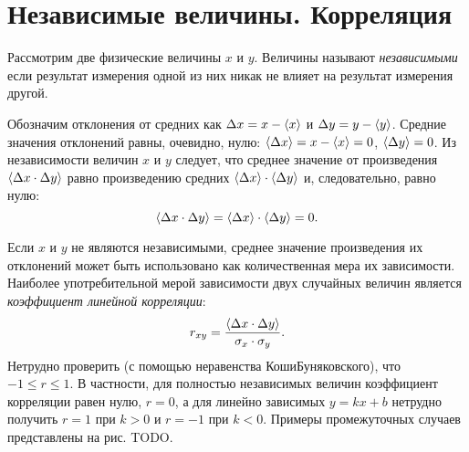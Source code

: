 %

\section{Независимые величины. Корреляция}

Рассмотрим две физические величины $x$ и $y$. Величины называют
\emph{независимыми} если результат измерения одной из них никак не
влияет на результат измерения другой.

Обозначим отклонения от средних как $\Delta x=x-\left<x\right>$ и $\Delta
y=y-\left<y\right>$.
Средние значения отклонений равны, очевидно, нулю: $\left<\Delta
x\right>=x-\left<x\right>=0$,
$\left<\Delta y\right>=0$. Из независимости величин $x$ и $y$ следует,
что среднее значение от произведения $\left<\Delta x\cdot\Delta y\right>$
равно произведению средних $\left<\Delta x\right>\cdot\left<\Delta y\right>$
и, следовательно, равно нулю:
\begin{equation}
\left<\Delta x\cdot\Delta y\right>=\left<\Delta x\right>\cdot\left<\Delta
y\right>=0.\label{eq:indep}
\end{equation}

Если $x$ и $y$ не являются независимыми, среднее значение произведения
их отклонений может быть использовано как количественная мера их зависимости.
Наиболее употребительной мерой зависимости двух случайных величин
является \emph{коэффициент линейной корреляции}:
\begin{equation}
r_{xy}=\frac{\left<\Delta x\cdot\Delta
y\right>}{\sigma_{x}\cdot\sigma_{y}}.\label{eq:pearson}
\end{equation}
Нетрудно проверить (с помощью неравенства Коши\textendash Буняковского),
что $-1\le r\le1$. В частности, для полностью независимых величин
коэффициент корреляции равен нулю, $r=0$, а для линейно зависимых
$y=kx+b$ нетрудно получить $r=1$ при $k>0$ и $r=-1$ при $k<0$.
Примеры промежуточных случаев представлены на рис. TODO.

